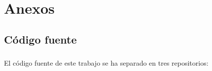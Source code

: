 
\chapter{Anexos}

%
%

\section{Código fuente}

\paragraph{}
El código fuente de este trabajo se ha separado en tres repositorios:
